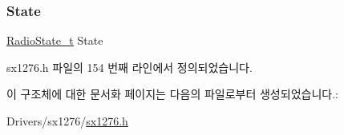 \subsubsection{\texorpdfstring{State}{State}}
{\footnotesize\ttfamily \mbox{\hyperlink{radio_8h_a2f3fa4ad0237c4ace94aa99086aac9f5}{Radio\+State\+\_\+t}} State}



sx1276.\+h 파일의 154 번째 라인에서 정의되었습니다.



이 구조체에 대한 문서화 페이지는 다음의 파일로부터 생성되었습니다.\+:\begin{DoxyCompactItemize}
\item 
Drivers/sx1276/\mbox{\hyperlink{sx1276_8h}{sx1276.\+h}}\end{DoxyCompactItemize}
